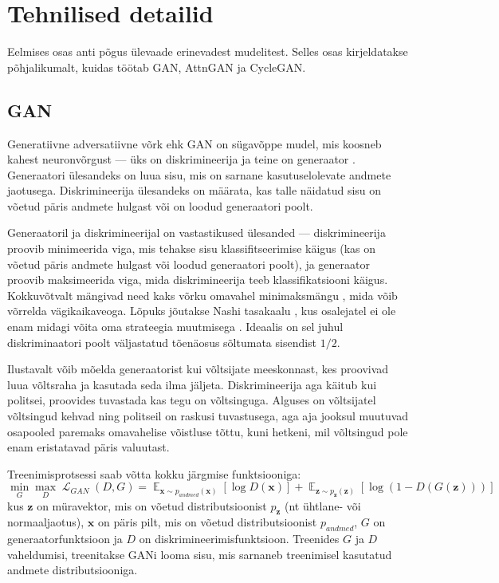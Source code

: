 \documentclass{vilgym}
\DeclareMathOperator{\EX}{\mathbb{E}}
\DeclareMathOperator{\loss}{\mathcal{L}}
\begin{document}
	\section{Tehnilised detailid}
	Eelmises osas anti põgus ülevaade erinevadest mudelitest. Selles osas kirjeldatakse põhjalikumalt, kuidas töötab GAN, AttnGAN ja CycleGAN.

	\subsection{GAN}
	Generatiivne adversatiivne võrk ehk GAN  on sügavõppe mudel, mis koosneb kahest neuronvõrgust --- üks on diskrimineerija  ja teine on generaator .  Generaatori ülesandeks on luua sisu, mis on sarnane kasutuselolevate andmete jaotusega. Diskrimineerija ülesandeks on määrata, kas talle näidatud sisu on võetud päris andmete hulgast või on loodud generaatori poolt.
	
	Generaatoril ja diskrimineerijal on vastastikused ülesanded --- diskrimineerija proovib minimeerida viga, mis tehakse sisu klassifitseerimise käigus (kas on võetud päris andmete hulgast või loodud generaatori poolt), ja generaator proovib maksimeerida viga, mida diskrimineerija teeb klassifikatsiooni käigus. Kokkuvõtvalt mängivad need kaks võrku omavahel minimaksmängu , mida võib võrrelda vägikaikaveoga. Lõpuks jõutakse Nashi tasakaalu , kus osalejatel ei ole enam midagi võita oma strateegia muutmisega \parencite{gametheory}. Ideaalis on sel juhul diskriminaatori poolt väljastatud tõenäosus sõltumata sisendist $ 1/2 $.

	Ilustavalt võib mõelda generaatorist kui võltsijate meeskonnast, kes proovivad luua võltsraha ja kasutada seda ilma jäljeta. Diskrimineerija aga käitub kui politsei, proovides tuvastada kas tegu on võltsinguga. Alguses on võltsijatel võltsingud kehvad ning politseil on raskusi tuvastusega, aga aja jooksul muutuvad osapooled paremaks omavahelise võistluse tõttu, kuni hetkeni, mil võltsingud pole enam eristatavad päris valuutast.

	Treenimisprotsessi saab võtta kokku järgmise funktsiooniga:
	\begin{equation} \label{eq:gan}
		\operatorname*{min}_G \operatorname*{max}_D \loss_{GAN}(D,G) = \EX_{\boldsymbol{x}\sim p_{andmed}(\boldsymbol{x})}[\log D(\boldsymbol{x})] + \EX_{\boldsymbol{z}\sim p_{\boldsymbol{z}}(\boldsymbol{z})}[\log(1-D(G(\boldsymbol{z})))]
	\end{equation}
	kus $ \boldsymbol{z} $ on müravektor, mis on võetud distributsioonist $ p_{\boldsymbol{z}} $ (nt ühtlane- või normaaljaotus), $ \boldsymbol{x} $ on päris pilt, mis on võetud distributsioonist $ p_{andmed} $, $ G $ on generaatorfunktsioon ja $ D $ on diskrimineerimisfunktsioon. Treenides $ G $ ja $ D $ vaheldumisi, treenitakse GANi looma sisu, mis sarnaneb treenimisel kasutatud andmete distributsiooniga. \parencite{gan}
\end{document}
